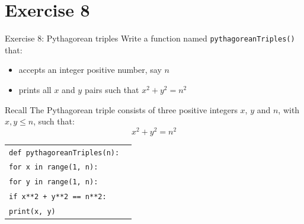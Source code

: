 \documentclass[t,handout,9pt]{beamer}
\begin{document}
\section{Exercise 8}
\begin{frame}{Exercise 8: Pythagorean triples}
\vfill
Write a function named \texttt{pythagoreanTriples()} that:
\begin{itemize}
	\item accepts an integer positive number, say $n$
	\item prints all $x$ and $y$ pairs such that $x^2+y^2=n^2$
\end{itemize}
\vfill
\begin{block}{Recall}
The Pythagorean triple consists of three positive integers $x$, $y$ and $n$, with $x,y \leq n$, such that:
\begin{equation*}
	x^2 + y^2 = n^2
\end{equation*}
\end{block}
\vfill
\end{frame}
%
\begin{frame}
	\vfill
		\begin{table}[]
		  \begin{flushleft}
		  \begin{tabular}{ll}
			\texttt{def pythagoreanTriples(n):}        & \\
			\texttt{\quad for x in range(1, n):}        & \\
			\texttt{\quad\quad	for y in range(1, n):}        & \\
			\texttt{\quad\quad\quad if x**2 + y**2 == n**2:}        & \\
			\texttt{\quad\quad\quad\quad	print(x, y)}        & \\
		  \end{tabular}
		  \end{flushleft}
		\end{table}
	\vfill
\end{frame}
\end{document}
